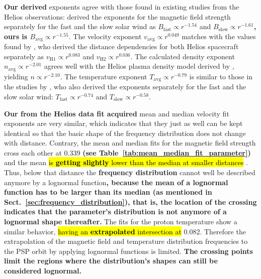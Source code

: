 \textbf{Our derived} exponents agree with those found in existing studies from the Helios observations: \citet{Mariani1978} derived the exponents for the magnetic field strength separately for the fast and the slow solar wind as $B_\text{fast} \propto r^{-1.54}$ and $B_\text{slow} \propto r^{-1.61}$\textbf{, ours is $B_\text{avg} \propto r^{-1.55}$}.
The velocity exponent \textbf{$v_\text{avg} \propto r^{0.049}$} matches with the values found by \citet{Schwenn1983,Schwenn1990}, who derived the distance dependencies for both Helios spacecraft separately as $v_\text{H1} \propto r^{0.083}$ and $v_\text{H2} \propto r^{0.036}$. The calculated density exponent \textbf{$n_\text{avg} \propto r^{-2.01}$} agrees well with the Helios plasma density model derived by \citet{Bougeret1984}, yielding $n \propto r^{-2.10}$.
The temperature exponent \textbf{$T_\text{avg} \propto r^{-0.79}$} is similar to those in the studies by \citet{Hellinger2011,Hellinger2013}, who also derived the exponents separately for the fast and the slow solar wind: $T_\text{fast} \propto r^{-0.74}$ and $T_\text{slow} \propto r^{-0.58}$.

\textbf{Our from the Helios data fit acquired} mean and median velocity fit exponents are very similar, which indicates that they just as well can be kept identical so that the basic shape of the frequency distribution does not change with distance. Contrary, the mean and median fits for the magnetic field strength cross each other at \SI{0.339}{\au} \textbf{(see Table~\ref{tab:mean_median_fit_parameter})} and the mean \hl{is \textbf{getting slightly} lower than the median at smaller distances }. Thus, below that distance the \textbf{frequency distribution} cannot well be described anymore by a lognormal function\textbf{, because the mean of a lognormal function has to be larger than its median (as mentioned in Sect.~\ref{sec:frequency_distribution}), that is, the location of the crossing indicates that the parameter's distribution is not anymore of a lognormal shape thereafter.} The fits for the proton temperature show a similar behavior, \hl{having an \textbf{extrapolated} intersection at } \SI{0.082}{\au}. Therefore the extrapolation of the magnetic field and temperature distribution frequencies to the PSP orbit by applying lognormal functions is limited. \textbf{The crossing points limit the regions where the distribution's shapes can still be considered lognormal.}

